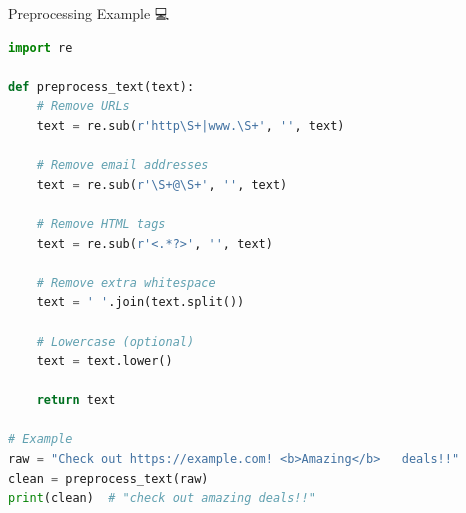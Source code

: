 \documentclass[aspectratio=169]{beamer}
\begin{document}
\begin{frame}[fragile]{Preprocessing Example 💻}
    \begin{lstlisting}[language=Python]
import re

def preprocess_text(text):
    # Remove URLs
    text = re.sub(r'http\S+|www.\S+', '', text)

    # Remove email addresses
    text = re.sub(r'\S+@\S+', '', text)

    # Remove HTML tags
    text = re.sub(r'<.*?>', '', text)

    # Remove extra whitespace
    text = ' '.join(text.split())

    # Lowercase (optional)
    text = text.lower()

    return text

# Example
raw = "Check out https://example.com! <b>Amazing</b>   deals!!"
clean = preprocess_text(raw)
print(clean)  # "check out amazing deals!!"
    \end{lstlisting}
\end{frame}
\end{document}
